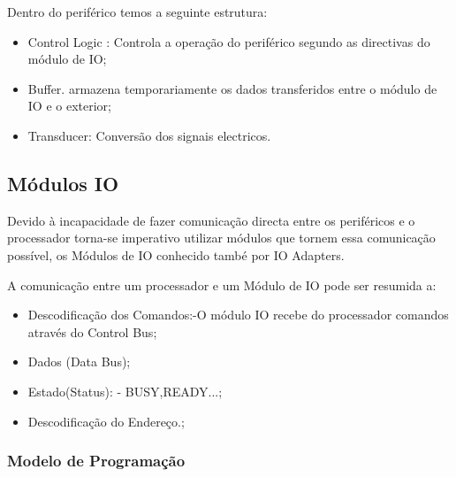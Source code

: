 \documentclass[10pt,a4paper]{paper}
\begin{document}
	\begin{flushleft}
		Dentro do periférico temos a seguinte estrutura:	
	\end{flushleft}
	\begin{itemize}
		\item Control Logic : Controla a operação do periférico segundo as directivas do módulo de IO;
		\item Buffer. armazena temporariamente os dados transferidos entre o módulo de IO e o exterior;
		\item Transducer:	 Conversão dos signais electricos.
	\end{itemize}
	\subsection*{Módulos IO}
	Devido à incapacidade de fazer comunicação directa entre os periféricos e o processador torna-se imperativo utilizar módulos que tornem essa comunicação possível, os Módulos de IO conhecido també por IO Adapters.
	
	A comunicação entre um processador e um Módulo de IO pode ser resumida a:
	\begin{itemize}
		\item Descodificação dos Comandos:-O módulo IO recebe do processador comandos através do Control Bus;
	 	\item Dados (Data Bus);
		 \item Estado(Status): - BUSY,READY...;
	 	\item Descodificação do Endereço.;
	\end{itemize}

	
	\subsubsection*{Modelo de Programação}
	
\end{document}
